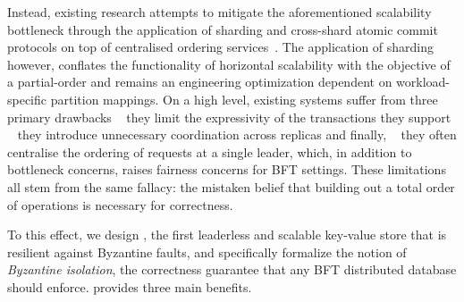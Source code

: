 Instead, existing research attempts to mitigate the aforementioned scalability bottleneck through the application of sharding and cross-shard atomic commit protocols on top of centralised ordering services~\cite{kokoris2018omniledger,al2017chainspace,padilha2016callinicos}. The application of sharding however, conflates the functionality of horizontal scalability with the objective of a partial-order and remains an engineering optimization dependent on workload-specific partition mappings.
On a high level, existing systems suffer from three primary drawbacks \one ~ they limit the expressivity of the transactions they support  \two ~ they introduce unnecessary coordination across replicas and finally,
\three ~ they often centralise the ordering of requests at a single leader, which, in addition to bottleneck concerns, raises fairness concerns for BFT settings. These limitations all stem from the same fallacy: the mistaken belief that building out a total order of operations is necessary for correctness. 
\fi



\iffalse 
In reality, building \textit{the abstraction} of a total order is sufficient, and distributed databases have long recognised this fact~\cite{crooks2018obladi,bernstein1979fas,Papadimitriou1979serializability,adya99weakconsis}. \fs{at this point a reader could expect us to talk about partial order and sharding - if we cut the Background section we currently do not mention sharding anywhere. That could seem ignorant.} Serializability, the gold-standard database criterion, defines a correct execution as one that is \textit{equivalent} to a correct schedule~\cite{bernstein1979fas,Papadimitriou1979serializability,bernstein1979fas}. This definition allows concurrent operations to execute in parallel and orders conflicting operations only.  Byzantine systems need be no different. This paper consequently argues for a paradigm "flip". The
right way to build BFT data-sharing systems is not to layer database-like transactions and sharding on top of a BFT log, but instead to do the opposite and build out the abstraction of a BFT log atop a partially ordered distributed database.
\fi



To this effect, we design \sys{}, the first leaderless and scalable key-value store that is resilient against
Byzantine faults, and specifically formalize the notion of \textit{Byzantine isolation}, the correctness
guarantee that any BFT distributed database should enforce.  \sys{} provides three main benefits.

